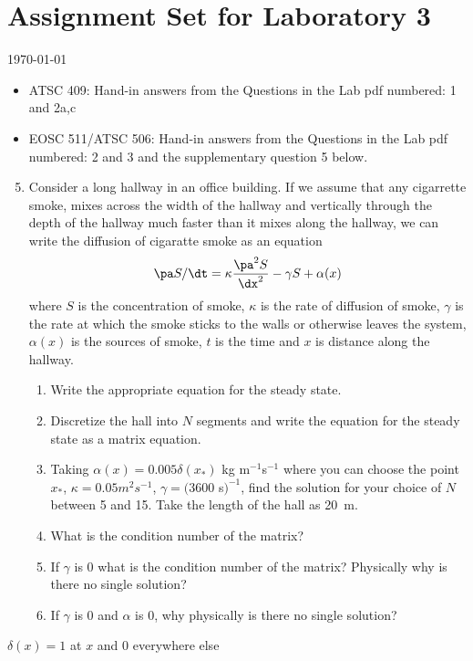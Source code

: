 \documentclass[12pt]{article}
\begin{document}
\section*{Assignment Set for Laboratory 3}

{\small \today \hspace{0.1in} \currenttime}

\begin{itemize}
\item ATSC 409: Hand-in answers from the Questions in the Lab pdf numbered: 1 and 2a,c
  
\item EOSC 511/ATSC 506:  Hand-in answers from the Questions in the Lab pdf
numbered: 2 and 3 and the supplementary question 5 below.
\end{itemize}

\begin{enumerate}
\setcounter{enumi}{4}
\item Consider a long hallway in an office building.  If we assume that any cigarrette smoke, mixes across the width of the hallway and vertically through the depth of the hallway much faster than it mixes along the hallway, we can write the diffusion of cigaratte smoke as an equation
\[
\pa S/\dt = \kappa \frac {\pa^2 S}{\dx^2} - \gamma S + \alpha(x)
\]
where $S$ is the concentration of smoke, $\kappa$ is the rate of diffusion of smoke, $\gamma$ is the rate at which the smoke sticks to the walls or otherwise leaves the system, $\alpha(x)$ is the sources of smoke, $t$ is the time and $x$ is distance along the hallway.
\begin{enumerate}
\item Write the appropriate equation for the steady state.
\item Discretize the hall into $N$ segments and write the equation for the steady state as a matrix equation.
\item Taking $\alpha(x) = 0.005 \delta(x_*)$ kg m$^{-1}$s$^{-1}$ where you can choose the point $x_*$, $\kappa = 0.05 m^2 s^{-1}$, $\gamma = (3600$ s$)^{-1}$, find the solution for your choice of $N$ between 5 and 15.  Take the length of the hall as 20~m.
\item What is the condition number of the matrix?
\item If $\gamma$ is 0 what is the condition number of the matrix?  Physically why is there no single solution?
\item If $\gamma$ is 0 and $\alpha$ is 0, why physically is there no single solution?
\end{enumerate}
\end{enumerate}

$\delta(x) = 1$ at $x$ and $0$ everywhere else
\end{document}
